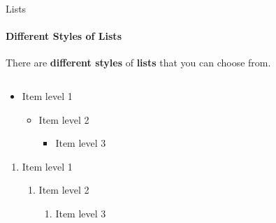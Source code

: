 \documentclass[aspectratio=169]{beamer}
\begin{document}
\begin{frame}{Lists}
    \framesubtitle{Different Styles of Lists}

    \vspace{-.8cm}
    \begin{coloredblock}[yellow]
        \centering
        There are \textbf{different styles} of \textbf{lists} that you can choose from.
    \end{coloredblock}

    \vspace{-0.5cm}

    \begin{columns}
        \begin{column}{0.49\textwidth}
            \begin{coloredblock}
                \begin{itemize}
                    \item Item level 1
                    \begin{itemize}
                        \item Item level 2
                        \begin{itemize}
                            \item Item level 3
                        \end{itemize}
                    \end{itemize}
                \end{itemize}
            \end{coloredblock}
    
            \begin{coloredblock}
                \begin{enumerate}
                \item Item level 1
                    \begin{enumerate}
                        \item Item level 2
                        \begin{enumerate}
                            \item Item level 3
                        \end{enumerate}
                    \end{enumerate}
                \end{enumerate}
            \end{coloredblock}
        \end{column}
        

\end{columns}
\end{frame}
\end{document}
